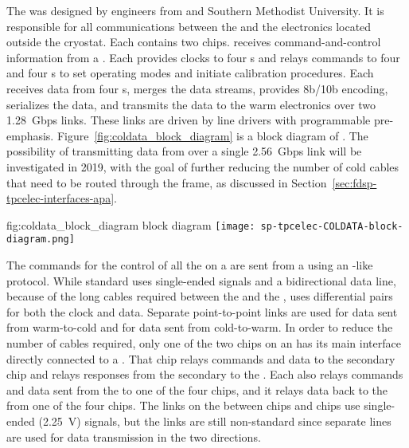 The   was designed by engineers from  
and Southern Methodist University. It is responsible for all communications 
between the  and the electronics located outside the cryostat. 
Each  contains two  chips.  receives 
command-and-control information from a . Each  provides 
clocks to four s and relays commands to four  
  and four s to set operating modes and 
initiate calibration procedures.  Each  receives data from four 
s, merges the data streams, provides 8b/10b encoding, serializes 
the data, and transmits the data to the warm electronics over two \SI{1.28}{Gbps} 
links.  These links are driven by line drivers with programmable pre-emphasis. 
Figure~\ref{fig:coldata_block_diagram} is a block diagram of . 
The possibility of transmitting data from  over a single 
\SI{2.56}{Gbps} link will be investigated in 2019, with the goal of further
reducing the number of cold cables that need to be routed through the
 frame, as discussed in Section~\ref{sec:fdsp-tpcelec-interfaces-apa}.

\begin{dunefigure}
{fig:coldata_block_diagram}
{ block diagram}
\texttt{[image: sp-tpcelec-COLDATA-block-diagram.png]}
\end{dunefigure}

The commands for the control of all the  on a  are sent 
from a   
using an -like~\cite{bib:I2C} protocol. While standard 
 uses single-ended  signals and a bidirectional data 
line, because of the long cables required between the  and the 
,  uses  differential pairs for both 
the  clock and data. Separate point-to-point links are used  for data sent from warm-to-cold and for data sent from cold-to-warm.  
In order to reduce the number of cables required, only one of the two 
 chips on an  has its main  interface 
directly connected to a . That  chip relays  
commands and data to the secondary  chip and relays  
responses from the secondary  to the . 
Each   also relays  commands and data sent from the 
 to one of the four  chips, and it relays data back to the  from one of the  four  chips. 
The links on the  between  
chips and  chips use single-ended (\SI{2.25}{V})  
signals, but the  links are still non-standard since separate lines are used for 
data transmission in the two directions.

